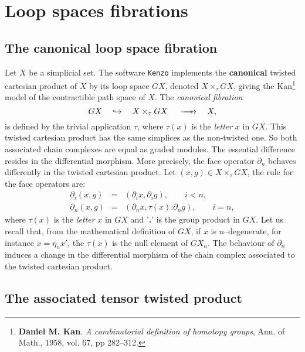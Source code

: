 \chapter {Loop spaces fibrations}

\section{The canonical loop space fibration}

Let $X$ be a  simplicial set. The software {\tt Kenzo} implements the
{\bf canonical} twisted cartesian product of $X$ by its loop space $GX$,
denoted $X \times_\tau GX$, giving the Kan\footnote {{\bf Daniel M. Kan}. {\em A combinatorial definition of
homotopy groups}, Ann. of Math., 1958, vol. 67, pp 282--312.} model of the contractible
path space of $X$.
The {\em canonical fibration}
$$ GX\quad \hookrightarrow\quad X \times_\tau GX  \hskip 1.2em \longrightarrow \hskip -1.2em \longrightarrow
   \quad X,$$
is defined by the trivial application $\tau$, where $\tau(x)$ is the  {\em letter} $x$ in $GX$.
This twisted cartesian product has the same simplices as the non-twisted one.
So both associated chain complexes
are equal as graded modules. The essential difference  resides in the differential morphism.
More precisely, the face operator $\partial_n$ behaves differently in the twisted cartesian product.
Let $(x,g) \in X \times_\tau GX$, the rule for the face operators are:
\begin{eqnarray*}
\partial_i(x,g) & =  & (\partial_i x, \partial_i g), \qquad i<n, \\
\partial_n(x,g) & =  & (\partial_n x, \tau(x).\partial_n g), \qquad i=n,
\end{eqnarray*}
where $\tau(x)$ is the {\em letter} $x$ in $GX$ and '{\bf .}' is the group product in $GX$. Let us recall
that, from the mathematical definition of $GX$, if $x$ is $n$--degenerate, for instance $x=\eta_n x'$,
the $\tau(x)$ is the null element of $GX_n$.
The behaviour of $\partial_n$ induces a change in the differential morphism of the chain complex
associated to the twisted cartesian product.

\section{The associated tensor twisted product}

